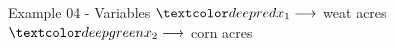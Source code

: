 \begin{frame}{Example 04 - Variables}
\Huge{
$\colora{{x}_{1}} \longrightarrow$
    weat acres \\ \vspace{1cm}
$\colorb{{x}_{2}} \longrightarrow$
    corn acres
}
\end{frame}
